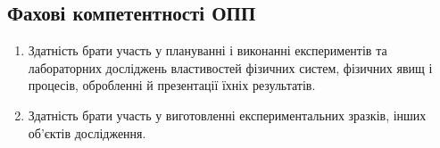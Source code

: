 \documentclass{Syllabus}
\begin{document}
\subsection*{Фахові компетентності ОПП}

\begin{enumerate}
	\item [ФК 2:] Здатність брати участь у плануванні і виконанні експериментів та лабораторних досліджень властивостей фізичних систем, фізичних явищ і процесів, обробленні й презентації їхніх результатів.
	\item [ФК 3:] Здатність брати участь у виготовленні експериментальних зразків, інших об'єктів дослідження.
\end{enumerate}
\end{document}
